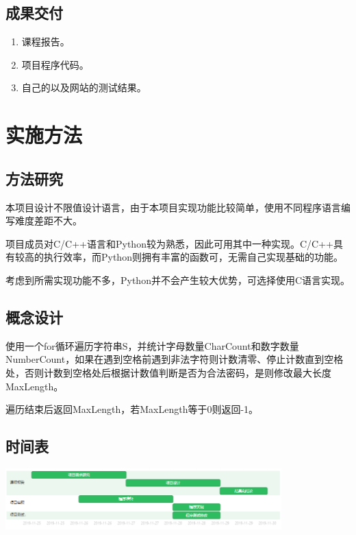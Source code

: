 \begin{spacing}{1.5}
    \subsection{成果交付}
    \begin{enumerate} [\indent 1、]
        \item 课程报告。
        \item 项目程序代码。
        \item 自己的以及网站的测试结果。
    \end{enumerate}
    \section{实施方法}
    \subsection{方法研究}
    本项目设计不限值设计语言，由于本项目实现功能比较简单，使用不同程序语言编写难度差距不大。

    项目成员对C/C++语言和Python较为熟悉，因此可用其中一种实现。C/C++具有较高的执行效率，而Python则拥有丰富的函数可，无需自己实现基础的功能。

    考虑到所需实现功能不多，Python并不会产生较大优势，可选择使用C语言实现。

    \subsection{概念设计}
    使用一个for循环遍历字符串S，并统计字母数量CharCount和数字数量NumberCount，如果在遇到空格前遇到非法字符则计数清零、停止计数直到空格处，否则计数到空格处后根据计数值判断是否为合法密码，是则修改最大长度MaxLength。

    遍历结束后返回MaxLength，若MaxLength等于0则返回-1。

    \subsection{时间表}
\begin{center}
\includegraphics[width=0.8\textwidth]{./gannt.png}
\end{center}


\end{spacing}
